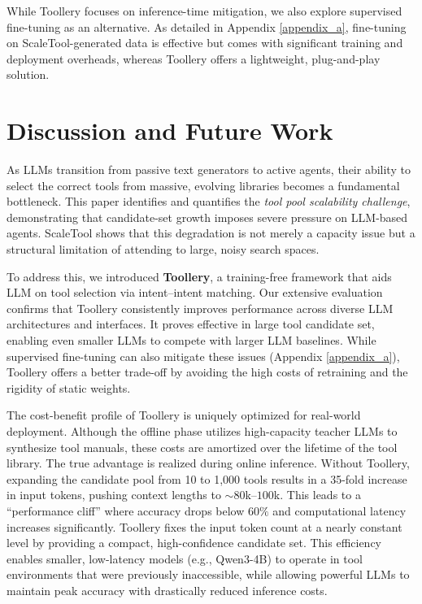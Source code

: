 \documentclass[11pt]{article}
\begin{document}
While Toollery focuses on inference-time mitigation, we also explore supervised fine-tuning as an alternative. As detailed in Appendix \ref{appendix_a}, fine-tuning on ScaleTool-generated data is effective but comes with significant training and deployment overheads, whereas Toollery offers a lightweight, plug-and-play solution.

\section{Discussion and Future Work}
As LLMs transition from passive text generators to active agents, their ability to select the correct tools from massive, evolving libraries becomes a fundamental bottleneck. This paper identifies and quantifies the \textit{tool pool scalability challenge}, demonstrating that candidate-set growth imposes severe pressure on LLM-based agents. ScaleTool shows that this degradation is not merely a capacity issue but a structural limitation of attending to large, noisy search spaces.


To address this, we introduced \textbf{Toollery}, a training-free framework that aids LLM on tool selection via intent--intent matching. Our extensive evaluation confirms that Toollery consistently improves performance across diverse LLM architectures and interfaces. It proves effective in large tool candidate set, enabling even smaller LLMs to compete with larger LLM baselines. While supervised fine-tuning can also mitigate these issues (Appendix \ref{appendix_a}), Toollery offers a better trade-off by avoiding the high costs of retraining and the rigidity of static weights.

The cost-benefit profile of Toollery is uniquely optimized for real-world deployment. Although the offline phase utilizes high-capacity teacher LLMs to synthesize tool manuals, these costs are amortized over the lifetime of the tool library. The true advantage is realized during online inference. Without Toollery, expanding the candidate pool from 10 to 1,000 tools results in a 35-fold increase in input tokens, pushing context lengths to $\sim80$k--$100$k. This leads to a ``performance cliff'' where accuracy drops below 60$\%$ and computational latency increases significantly. Toollery fixes the input token count at a nearly constant level by providing a compact, high-confidence candidate set. This efficiency enables smaller, low-latency models (e.g., Qwen3-4B) to operate in tool environments that were previously inaccessible, while allowing powerful LLMs to maintain peak accuracy with drastically reduced inference costs.
\end{document}
